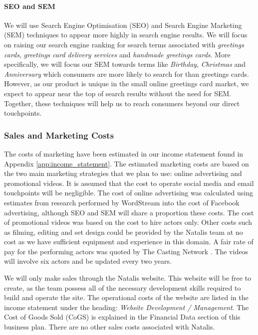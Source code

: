 \documentclass[10pt,a4paper]{article}
\begin{document}
\paragraph{SEO and SEM}
We will use Search Engine Optimisation (SEO) and Search Engine Marketing (SEM) techniques to appear more highly in search engine results. We will focus on raising our search engine ranking for search terms associated with \textit{greetings cards}, \textit{greetings card delivery services} and \textit{handmade greetings cards}. More specifically, we will focus our SEM towards terms like \textit{Birthday}, \textit{Christmas} and \textit{Anniversary} which consumers are more likely to search for than greetings cards. However, as our product is unique in the small online greetings card market, we expect to appear near the top of search results without the need for SEM. Together, these techniques will help us to reach consumers beyond our direct touchpoints.

\subsubsection*{Sales and Marketing Costs}
The costs of marketing have been estimated in our income statement found in Appendix \ref{app:income_statement}. The estimated marketing costs are based on the two main marketing strategies that we plan to use: online advertising and promotional videos. It is assumed that the cost to operate social media and email touchpoints will be negligible. The cost of online advertising was calculated using estimates from research performed by WordStream \citep{wordstream} into the cost of Facebook advertising, although SEO and SEM will share a proportion these costs. The cost of promotional videos was based on the cost to hire actors only. Other costs such as filming, editing and set design could be provided by the Natalis team at no cost as we have sufficient equipment and experience in this domain. A fair rate of pay for the performing actors was quoted by The Casting Network \citep{casting}. The videos will involve six actors and be updated every two years.

We will only make sales through the Natalis website. This website will be free to create, as the team possess all of the necessary development skills required to build and operate the site. The operational costs of the website are listed in the income statement under the heading: \textit{Website Development / Management}. The Cost of Goods Sold (CoGS) is explained in the Financial Data section of this business plan. There are no other sales costs associated with Natalis.
\end{document}
